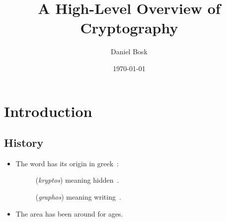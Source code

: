 \title{%
  A High-Level Overview of Cryptography
}
\author{%
  Daniel Bosk
}
\date{\today}

\maketitle

\mode*

\begin{abstract}
  
\end{abstract}





\section{Introduction}

\subsection{History}

\begin{frame}
  \begin{itemize}
    \item The word has its origin in greek~:
      \begin{description}
        \item[] (\emph{kryptos}) meaning 
          hidden~.
        \item[] (\emph{graphos}) meaning 
          writing~.
      \end{description}

      \pause{}

    \item The area has been around for ages.

  \end{itemize}
\end{frame}

